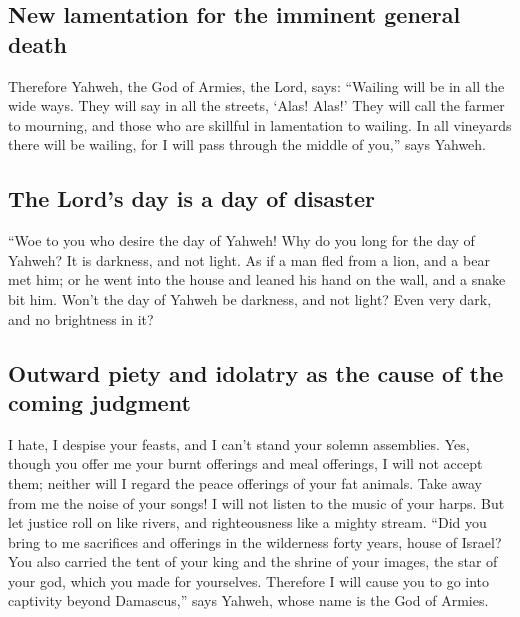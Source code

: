 \begin{paracol}{2}
\begin{otherlanguage}{english}
\hypertarget{new-lamentation-for-the-imminent-general-death}{%
\subsection{New lamentation for the imminent general
death}\label{new-lamentation-for-the-imminent-general-death}}

 Therefore Yahweh, the God of Armies, the Lord, says:
``Wailing will be in all the wide ways. They will say in all the
streets, `Alas! Alas!' They will call the farmer to mourning, and those
who are skillful in lamentation to wailing.  In all
vineyards there will be wailing, for I will pass through the middle of
you,'' says Yahweh.

\hypertarget{the-lords-day-is-a-day-of-disaster}{%
\subsection{The Lord's day is a day of
disaster}\label{the-lords-day-is-a-day-of-disaster}}

 ``Woe to you who desire the day of Yahweh! Why do you
long for the day of Yahweh? It is darkness, and not light.
 As if a man fled from a lion, and a bear met him; or he
went into the house and leaned his hand on the wall, and a snake bit
him.  Won't the day of Yahweh be darkness, and not light?
Even very dark, and no brightness in it?

\hypertarget{outward-piety-and-idolatry-as-the-cause-of-the-coming-judgment}{%
\subsection{Outward piety and idolatry as the cause of the coming
judgment}\label{outward-piety-and-idolatry-as-the-cause-of-the-coming-judgment}}

 I hate, I despise your feasts, and I can't stand your
solemn assemblies.  Yes, though you offer me your burnt
offerings and meal offerings, I will not accept them; neither will I
regard the peace offerings of your fat animals.  Take
away from me the noise of your songs! I will not listen to the music of
your harps.  But let justice roll on like rivers, and
righteousness like a mighty stream.  ``Did you bring to
me sacrifices and offerings in the wilderness forty years, house of
Israel?  You also carried the tent of your king and the
shrine of your images, the star of your god, which you made for
yourselves.  Therefore I will cause you to go into
captivity beyond Damascus,'' says Yahweh, whose name is the God of
Armies.


\end{otherlanguage}
\end{paracol}
